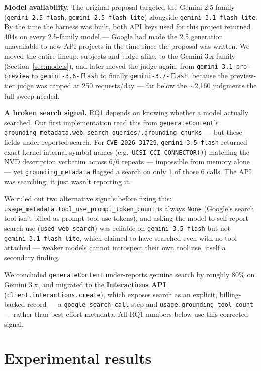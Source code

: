 \documentclass[11pt]{article}
\begin{document}
\textbf{Model availability.} The original proposal targeted the Gemini 2.5 family (\texttt{gemini-2.5-flash}, \texttt{gemini-2.5-flash-lite}) alongside \texttt{gemini-3.1-flash-lite}. By the time the harness was built, both API keys used for this project returned 404s on every 2.5-family model — Google had made the 2.5 generation unavailable to new API projects in the time since the proposal was written. We moved the entire lineup, subjects and judge alike, to the Gemini 3.x family (Section~\ref{sec:models}), and later moved the judge again, from \texttt{gemini-3.1-pro-preview} to \texttt{gemini-3.6-flash} to finally \texttt{gemini-3.7-flash}, because the preview-tier judge was capped at 250 requests/day — far below the $\sim$2{,}160 judgments the full sweep needed.

\textbf{A broken search signal.} RQ1 depends on knowing whether a model actually searched. Our first implementation read this from \texttt{generateContent}'s \texttt{grounding\_metadata.web\_search\_queries}/\texttt{.grounding\_chunks} — but these fields under-reported search. For \texttt{CVE-2026-31729}, \texttt{gemini-3.5-flash} returned exact kernel-internal symbol names (e.g.\ \texttt{UCSI\_CCI\_CONNECTOR()}) matching the NVD description verbatim across 6/6 repeats — impossible from memory alone — yet \texttt{grounding\_metadata} flagged a search on only 1 of those 6 calls. The API was searching; it just wasn't reporting it.

We ruled out two alternative signals before fixing this: \texttt{usage\_metadata.tool\_use\_prompt\_token\_count} is always \texttt{None} (Google's search tool isn't billed as prompt tool-use tokens), and asking the model to self-report search use (\texttt{used\_web\_search}) was reliable on \texttt{gemini-3.5-flash} but not \texttt{gemini-3.1-flash-lite}, which claimed to have searched even with no tool attached — weaker models cannot introspect their own tool use, itself a secondary finding.

We concluded \texttt{generateContent} under-reports genuine search by roughly 80\% on Gemini 3.x, and migrated to the \textbf{Interactions API} (\texttt{client.interactions.create}), which exposes search as an explicit, billing-backed record — a \texttt{google\_search\_call} step and \texttt{usage.grounding\_tool\_count} — rather than best-effort metadata. All RQ1 numbers below use this corrected signal.

\section{Experimental results}
\end{document}
